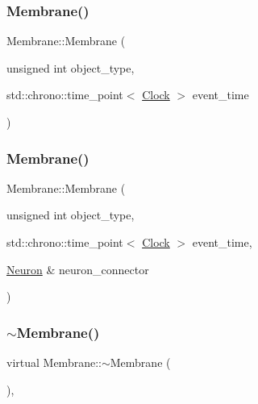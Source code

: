 \mbox{\label{classMembrane_afeb8292866a69bdc2b9be6dcd902b519}} 
\subsubsection{\texorpdfstring{Membrane()}{Membrane()}\hspace{0.1cm}{\footnotesize\ttfamily [3/4]}}
{\footnotesize\ttfamily Membrane\+::\+Membrane (\begin{DoxyParamCaption}\item[{unsigned int}]{object\+\_\+type,  }\item[{std\+::chrono\+::time\+\_\+point$<$ \mbox{\hyperlink{universe_8h_a0ef8d951d1ca5ab3cfaf7ab4c7a6fd80}{Clock}} $>$}]{event\+\_\+time }\end{DoxyParamCaption})\hspace{0.3cm}{\ttfamily [inline]}}

\mbox{\label{classMembrane_a8d61894d90a7f63e427cd8b1a5eca380}} 
\subsubsection{\texorpdfstring{Membrane()}{Membrane()}\hspace{0.1cm}{\footnotesize\ttfamily [4/4]}}
{\footnotesize\ttfamily Membrane\+::\+Membrane (\begin{DoxyParamCaption}\item[{unsigned int}]{object\+\_\+type,  }\item[{std\+::chrono\+::time\+\_\+point$<$ \mbox{\hyperlink{universe_8h_a0ef8d951d1ca5ab3cfaf7ab4c7a6fd80}{Clock}} $>$}]{event\+\_\+time,  }\item[{\mbox{\hyperlink{classNeuron}{Neuron}} \&}]{neuron\+\_\+connector }\end{DoxyParamCaption})\hspace{0.3cm}{\ttfamily [inline]}}

\mbox{\label{classMembrane_a8765daf8038c1e992e3ea3752db0042f}} 
\subsubsection{\texorpdfstring{$\sim$\+Membrane()}{~Membrane()}}
{\footnotesize\ttfamily virtual Membrane\+::$\sim$\+Membrane (\begin{DoxyParamCaption}{ }\end{DoxyParamCaption})\hspace{0.3cm}{\ttfamily [inline]}, {\ttfamily [virtual]}}

